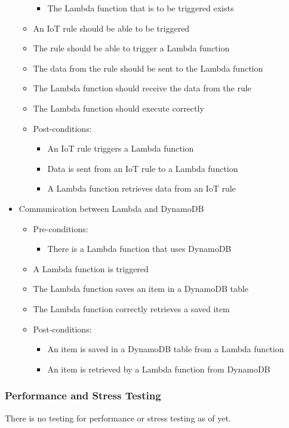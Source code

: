 \documentclass{article}
\begin{document}
\begin{itemize}
\begin{itemize}
\begin{itemize}
							\item The Lambda function that is to be triggered exists
						\end{itemize}
						\item An IoT rule should be able to be triggered
						\item The rule should be able to trigger a Lambda function
						\item The data from the rule should be sent to the Lambda function 
						\item The Lambda function should receive the data from the rule
						\item The Lambda function should execute correctly
						\item Post-conditions:
						\begin{itemize}
							\item An IoT rule triggers a Lambda function
							\item Data is sent from an IoT rule to a Lambda function
							\item A Lambda function retrieves data from an IoT rule
						\end{itemize}
					\end{itemize}
					
					\item{Communication between Lambda and DynamoDB}
					\begin{itemize}
						\item Pre-conditions: 
						\begin{itemize}
							\item There is a Lambda function that uses DynamoDB
						\end{itemize}
						\item A Lambda function is triggered
						\item The Lambda function saves an item in a DynamoDB table
						\item The Lambda function correctly retrieves a saved item
						\item Post-conditions:
						\begin{itemize}
							\item An item is saved in a DynamoDB table from a Lambda function
							\item An item is retrieved by a Lambda function from DynamoDB
						\end{itemize}
					\end{itemize}
				\end{itemize}
				
				\subsubsection{Performance and Stress Testing}
				There is no testing for performance or stress testing as of yet.
	\newpage
	
\end{document}
